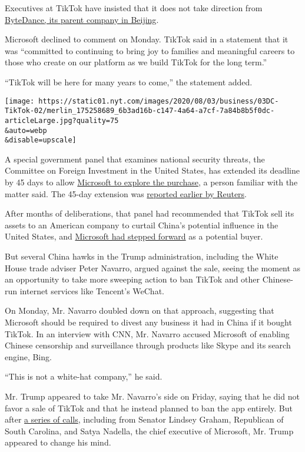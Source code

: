 Executives at TikTok have insisted that it does not take direction from
\href{https://www.nytimes.com/2020/08/03/technology/tiktok-bytedance-us-china.html}{ByteDance,
its parent company in Beijing}.

Microsoft declined to comment on Monday. TikTok said in a statement that
it was ``committed to continuing to bring joy to families and meaningful
careers to those who create on our platform as we build TikTok for the
long term.''

``TikTok will be here for many years to come,'' the statement added.

\texttt{[image: https://static01.nyt.com/images/2020/08/03/business/03DC-TikTok-02/merlin\_175258689\_6b3ad16b-c147-4a64-a7cf-7a84b8b5f0dc-articleLarge.jpg?quality=75\\\&auto=webp\\\&disable=upscale]}

A special government panel that examines national security threats, the
Committee on Foreign Investment in the United States, has extended its
deadline by 45 days to allow
\href{https://www.nytimes.com/2020/08/03/technology/tiktok-microsoft-tweens.html}{Microsoft
to explore the purchase}, a person familiar with the matter said. The
45-day extension was
\href{https://www.reuters.com/article/us-usa-tiktok-trump-exclusive/exclusive-trump-gives-microsoft-45-days-to-clinch-tiktok-deal-idUSKBN24Y0UD}{reported
earlier by Reuters}.

After months of deliberations, that panel had recommended that TikTok
sell its assets to an American company to curtail China's potential
influence in the United States, and
\href{https://www.nytimes.com/2020/07/31/technology/tiktok-microsoft.html}{Microsoft
had stepped forward} as a potential buyer.

But several China hawks in the Trump administration, including the White
House trade adviser Peter Navarro, argued against the sale, seeing the
moment as an opportunity to take more sweeping action to ban TikTok and
other Chinese-run internet services like Tencent's WeChat.

On Monday, Mr. Navarro doubled down on that approach, suggesting that
Microsoft should be required to divest any business it had in China if
it bought TikTok. In an interview with CNN, Mr. Navarro accused
Microsoft of enabling Chinese censorship and surveillance through
products like Skype and its search engine, Bing.

``This is not a white-hat company,'' he said.

Mr. Trump appeared to take Mr. Navarro's side on Friday, saying that he
did not favor a sale of TikTok and that he instead planned to ban the
app entirely. But after
\href{https://www.nytimes.com/2020/08/02/business/economy/trump-tiktok-china-national-security.html}{a
series of calls}, including from Senator Lindsey Graham, Republican of
South Carolina, and Satya Nadella, the chief executive of Microsoft, Mr.
Trump appeared to change his mind.

